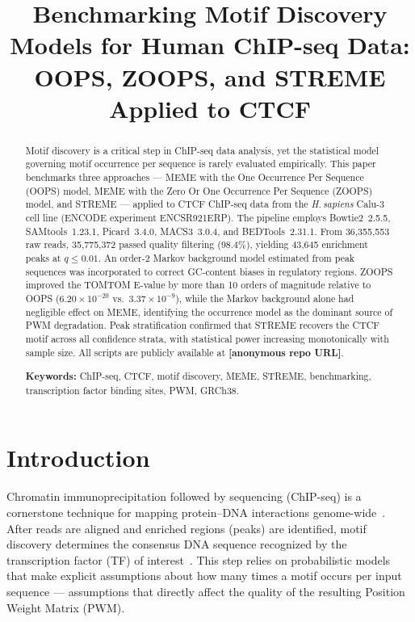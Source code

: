 \documentclass[12pt]{article}
\title{Benchmarking Motif Discovery Models for Human ChIP-seq Data:\\
OOPS, ZOOPS, and STREME Applied to CTCF}
\author{}
\newcommand{\ph}[1]{\colorbox{yellow!50}{\textbf{[#1]}}}
\begin{document}
\maketitle

\begin{abstract}
Motif discovery is a critical step in ChIP-seq data analysis, yet the statistical
model governing motif occurrence per sequence is rarely evaluated empirically.
This paper benchmarks three approaches --- MEME with the One Occurrence Per Sequence
(OOPS) model, MEME with the Zero Or One Occurrence Per Sequence (ZOOPS) model,
and STREME --- applied to CTCF ChIP-seq data from the \textit{H.\,sapiens} Calu-3
cell line (ENCODE experiment ENCSR921ERP).
The pipeline employs Bowtie2~2.5.5, SAMtools~1.23.1, Picard~3.4.0,
MACS3~3.0.4, and BEDTools~2.31.1.
From 36,355,553 raw reads, 35,775,372 passed quality filtering (98.4\%),
yielding 43,645 enrichment peaks at $q \leq 0.01$.
An order-2 Markov background model estimated from peak sequences was incorporated
to correct GC-content biases in regulatory regions.
ZOOPS improved the TOMTOM E-value by more than 10 orders of magnitude relative
to OOPS ($6.20 \times 10^{-20}$ vs.\ $3.37 \times 10^{-9}$), while the Markov
background alone had negligible effect on MEME, identifying the occurrence model
as the dominant source of PWM degradation.
Peak stratification confirmed that STREME recovers the CTCF motif across all
confidence strata, with statistical power increasing monotonically with sample
size.
All scripts are publicly available at \ph{anonymous repo URL}.

\textbf{Keywords:} ChIP-seq, CTCF, motif discovery, MEME, STREME, benchmarking,
transcription factor binding sites, PWM, GRCh38.
\end{abstract}

\section{Introduction}

Chromatin immunoprecipitation followed by sequencing (ChIP-seq) is a cornerstone
technique for mapping protein--DNA interactions genome-wide~\cite{park2009}.
After reads are aligned and enriched regions (peaks) are identified, motif
discovery determines the consensus DNA sequence recognized by the transcription
factor (TF) of interest~\cite{bailey2015}. This step relies on probabilistic
models that make explicit assumptions about how many times a motif occurs per
input sequence --- assumptions that directly affect the quality of the resulting
Position Weight Matrix (PWM).
\end{document}
